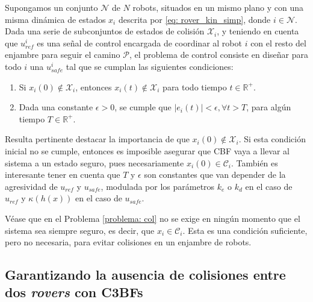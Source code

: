 \begin{problema} \label{problema: col} 
    Supongamos un conjunto $\mathcal{N}$ de $N$ robots, situados en un mismo plano y con una misma dinámica de estados $x_i$ descrita por \eqref{eq: rover_kin_simp}, donde $i \in \mathcal{N}$. Dada una serie de subconjuntos de estados de colisión $\mathcal{X}_i$, y teniendo en cuenta que $u_{ref}^i$ es una señal de control encargada de coordinar al robot $i$ con el resto del enjambre para seguir el camino $\mathcal{P}$, el problema de control consiste en diseñar para todo $i$ una $u_{safe}^i$ tal que se cumplan las siguientes condiciones:
    \begin{enumerate}
        \item Si $x_i(0) \notin \mathcal{X}_i$, entonces $x_i(t) \notin \mathcal{X}_i$ para todo tiempo $t \in \mathds{R}^+$.
        \item Dada una constante $\epsilon > 0$, se cumple que $|e_i(t)| < \epsilon, \forall t > T$, para algún tiempo $T \in \mathds{R}^+$.
    \end{enumerate}
\end{problema}

Resulta pertinente destacar la importancia de que $x_i(0) \notin \mathcal{X}_i$. Si esta condición inicial no se cumple, entonces es imposible asegurar que CBF vaya a llevar al sistema a un estado seguro, pues necesariamente $x_i(0) \in \mathcal{C}_i$. También es interesante tener en cuenta que $T$ y $\epsilon$ son constantes que van depender de la agresividad de $u_{ref}$ y $u_{safe}$, modulada por los parámetros $k_e$ o $k_d$ en el caso de $u_{ref}$ y $\kappa(h(x))$ en el caso de $u_{safe}$.

Véase que en el Problema \ref{problema: col} no se exige en ningún momento que el sistema sea siempre seguro, es decir, que $x_i \in \mathcal{C}_i$. Esta es una condición suficiente, pero no necesaria, para evitar colisiones en un enjambre de robots.




\subsection{Garantizando la ausencia de colisiones entre dos \textit{rovers} con C3BFs}

